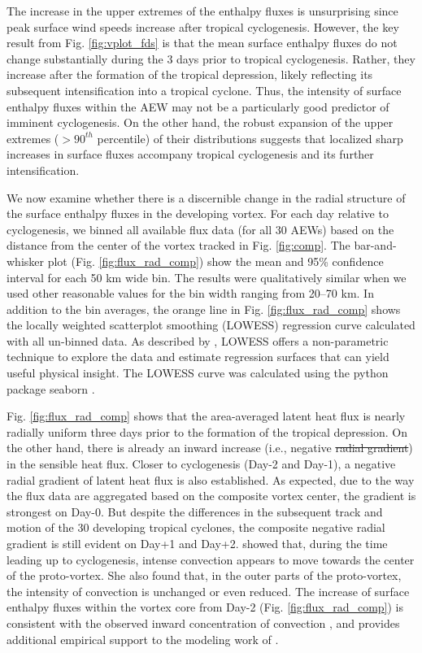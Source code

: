 \documentclass[draft]{agujournal2019}
\providecommand{\DIFadd}[1]{{\protect\color{blue}\uwave{#1}}} %
\providecommand{\DIFdel}[1]{{\protect\color{red}\sout{#1}}}                      %
\providecommand{\DIFaddbegin}{} %
\providecommand{\DIFaddend}{} %
\providecommand{\DIFdelbegin}{} %
\providecommand{\DIFdelend}{} %
\begin{document}
The increase in the upper extremes of the enthalpy fluxes is unsurprising since peak surface wind speeds increase after tropical cyclogenesis. However, the key result from Fig. \ref{fig:vplot_fds} is that the mean surface enthalpy fluxes do not change substantially during the 3 days prior to tropical cyclogenesis. Rather, they increase after the formation of the tropical depression, likely reflecting its subsequent intensification into a tropical cyclone.  Thus, the intensity of surface enthalpy fluxes within the AEW may not be a particularly good predictor of imminent cyclogenesis. On the other hand, the robust expansion of the upper extremes ($>90^{th}$ percentile) of their distributions suggests that localized sharp increases in surface fluxes accompany tropical cyclogenesis and its further intensification. 

We now examine whether there is a discernible change in the radial structure of the surface enthalpy fluxes in the developing vortex. For each day relative to cyclogenesis, we binned all available flux data (for all 30 AEWs) based on the distance from the center of the vortex tracked in Fig. \ref{fig:comp}. 
The bar-and-whisker plot (Fig. \ref{fig:flux_rad_comp}) show the mean and 
95\% confidence interval for each 50 km wide bin.  The results were qualitatively similar when we used other reasonable values for the bin width ranging from 20--70 km. In addition to the bin averages, the orange line in Fig. \ref{fig:flux_rad_comp} shows the locally weighted scatterplot smoothing (LOWESS) regression curve calculated with all un-binned data. As described by , LOWESS offers a non-parametric technique to explore the data and estimate regression surfaces that can yield useful physical insight. The LOWESS curve was calculated using the python package seaborn \cite{Waskom2021}.


Fig. \ref{fig:flux_rad_comp} shows that the area-averaged latent heat flux is nearly radially uniform three days prior to the formation of the tropical depression. On the other hand, there is already an inward increase  (i.e., negative \DIFdelbegin \DIFdel{radial gradient}\DIFdelend \DIFaddbegin \DIFadd{radial-gradient}\DIFaddend ) in the sensible heat flux. Closer to cyclogenesis (Day-2 and Day-1), a negative radial gradient of latent heat flux is also established. As expected, due to the way the flux data are aggregated based on the composite vortex center, the gradient is strongest on Day-0. But despite the differences in the subsequent track and motion of the 30 developing tropical cyclones, the composite negative radial gradient is still evident on  Day+1 and Day+2.  showed that, during the time leading up to cyclogenesis, intense convection appears to move towards the center of the proto-vortex. She also found that, in the outer parts of the proto-vortex, the intensity of convection is unchanged or even reduced. The increase of surface enthalpy fluxes within the vortex core from Day-2 (Fig. \ref{fig:flux_rad_comp}) is consistent with the observed inward concentration of convection \cite{WZ2018}, and provides additional empirical support to the modeling work of . 
\end{document}
